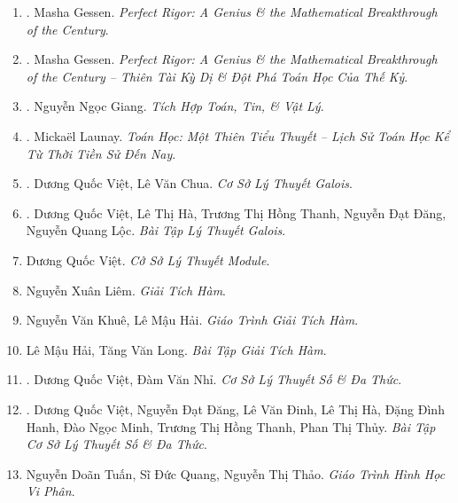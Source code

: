 \documentclass{article}
\begin{document}
\begin{enumerate}
	\item \cite{Gessen2009}. Masha Gessen. {\it Perfect Rigor: A Genius \& the Mathematical Breakthrough of the Century}.\hfill{\sf[done]}
	
	\item \cite{Gessen2022}. Masha Gessen. {\it Perfect Rigor: A Genius \& the Mathematical Breakthrough of the Century -- Thiên Tài Kỳ Dị \& Đột Phá Toán Học Của Thế Kỷ}.\hfill{\sf[reading]}
	\item \cite{Giang_tich_hop_Toan_Tin_Ly}. Nguyễn Ngọc Giang. {\it Tích Hợp Toán, Tin, \& Vật Lý}.\hfill{\sf[reading]}
	
	\item \cite{Launay2022}. Micka\"el Launay. {\it Toán Học: Một Thiên Tiểu Thuyết -- Lịch Sử Toán Học Kể Từ Thời Tiền Sử Đến Nay}.\hfill{\sf[done]}
	
	\item \cite{Viet_Chua2022}. Dương Quốc Việt, Lê Văn Chua. {\it Cơ Sở Lý Thuyết Galois}.\hfill{\sf[reading]}
	
	\item \cite{Viet_Ha_Thanh_Dang_Loc2022}. Dương Quốc Việt, Lê Thị Hà, Trương Thị Hồng Thanh, Nguyễn Đạt Đăng, Nguyễn Quang Lộc. {\it Bài Tập Lý Thuyết Galois}.\hfill{\sf[reading]}
	\item Dương Quốc Việt. {\it Cở Sở Lý Thuyết Module}.
	
	\item Nguyễn Xuân Liêm. {\it Giải Tích Hàm}.
	
	\item Nguyễn Văn Khuê, Lê Mậu Hải. {\it Giáo Trình Giải Tích Hàm}.
	
	\item Lê Mậu Hải, Tăng Văn Long. {\it Bài Tập Giải Tích Hàm}.
	
	\item \cite{Viet_Nhi_number_theory_polynomial}. Dương Quốc Việt, Đàm Văn Nhỉ. {\it Cơ Sở Lý Thuyết Số \& Đa Thức}.\hfill{\sf[reading]}
	
	\item \cite{Viet_Dang_Dinh_Ha_Hanh_Minh_Thanh_Thuy2022}. Dương Quốc Việt, Nguyễn Đạt Đăng, Lê Văn Đinh, Lê Thị Hà, Đặng Đình Hanh, Đào Ngọc Minh, Trương Thị Hồng Thanh, Phan Thị Thủy. {\it Bài Tập Cơ Sở Lý Thuyết Số \& Đa Thức}.\hfill{\sf[reading]}
	
	\item Nguyễn Doãn Tuấn, Sĩ Đức Quang, Nguyễn Thị Thảo. {\it Giáo Trình Hình Học Vi Phân}.
	

\end{enumerate}
\end{document}
